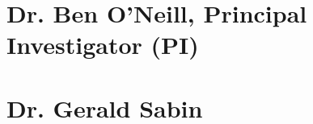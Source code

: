 


\fontsize{11}
\section{Dr. Ben O'Neill, Principal Investigator (PI)}



\section{Dr. Gerald Sabin}



